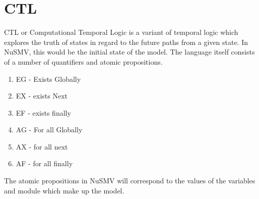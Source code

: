 \section{CTL}
CTL or Computational Temporal Logic is a variant of temporal logic which explores the truth of states in regard to the future paths from  a given state. In NuSMV, this would be the initial state of the model. The language itself consists of a number of quantifiers and atomic propositions.
\begin{enumerate}
\item EG - Exists Globally
\item EX - exists Next
\item EF - exists finally
\item AG - For all Globally
\item AX - for all next
\item AF - for all finally
\end{enumerate}
The atomic propositions in NuSMV will correspond to the values of the variables  and module which make up the model.

